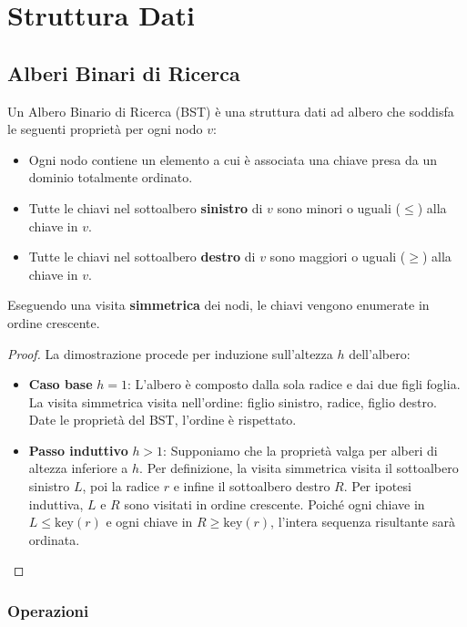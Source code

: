 \setchapterpreamble[u]{\margintoc}
\chapter{Struttura Dati}

\section{Alberi Binari di Ricerca}
Un Albero Binario di Ricerca (BST) è una struttura dati ad albero che soddisfa le seguenti proprietà per ogni nodo $v$:
\begin{itemize}
    \item Ogni nodo contiene un elemento a cui è associata una chiave presa da un dominio totalmente ordinato.
    \item Tutte le chiavi nel sottoalbero \textbf{sinistro} di $v$ sono minori o uguali ($\leq$) alla chiave in $v$.
    \item Tutte le chiavi nel sottoalbero \textbf{destro} di $v$ sono maggiori o uguali ($\geq$) alla chiave in $v$.
\end{itemize}

\begin{kaobox}[frametitle=Note] 
Eseguendo una visita \textbf{simmetrica} dei nodi, le chiavi vengono enumerate in ordine crescente.
\end{kaobox}

\begin{proof}
La dimostrazione procede per induzione sull'altezza $h$ dell'albero:
\begin{itemize}
    \item \textbf{Caso base} $h=1$: L'albero è composto dalla sola radice e dai due figli foglia. La visita simmetrica visita nell'ordine: figlio sinistro, radice, figlio destro. Date le proprietà del BST, l'ordine è rispettato.
    \item \textbf{Passo induttivo} $h>1$: Supponiamo che la proprietà valga per alberi di altezza inferiore a $h$. Per definizione, la visita simmetrica visita il sottoalbero sinistro $L$, poi la radice $r$ e infine il sottoalbero destro $R$. 
    Per ipotesi induttiva, $L$ e $R$ sono visitati in ordine crescente. Poiché ogni chiave in $L \leq \text{key}(r)$ e ogni chiave in $R \geq \text{key}(r)$, l'intera sequenza risultante sarà ordinata.
\end{itemize}
\end{proof}

\subsection{Operazioni}


